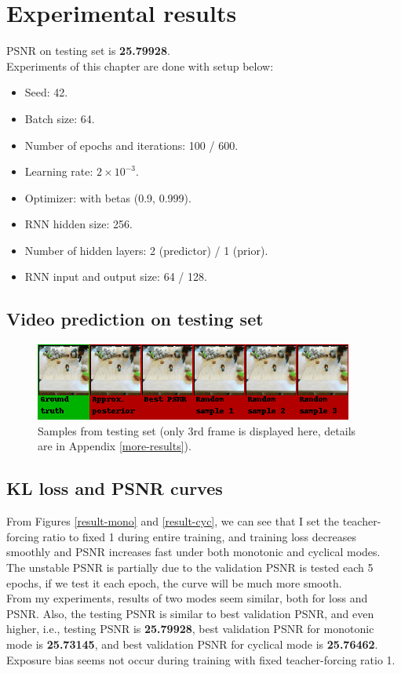 \chapter{Experimental results}
\indent
	PSNR on testing set is \textbf{25.79928}. \\
	Experiments of this chapter are done with setup below: 
	\begin{itemize}
		\item Seed: 42.
		\item Batch size: 64.
		\item Number of epochs and iterations: 100 / 600.
		\item Learning rate: $2 \times 10^{-3}$.
		\item Optimizer:  with betas (0.9, 0.999).
		\item RNN hidden size: 256.
		\item Number of hidden layers: 2 (predictor) / 1 (prior).
		\item RNN input and output size: 64 / 128.
	\end{itemize} 

\section{Video prediction on testing set}
	\begin{figure}[H]
		\centering
		\includegraphics[scale=0.9]{img/test_pred-2.png}
		\caption{Samples from testing set (only 3rd frame is displayed here, details are in Appendix \ref{more-results}).}
		\label{test-prediction}
	\end{figure}

\section{KL loss and PSNR curves}
	From Figures \ref{result-mono} and \ref{result-cyc}, 
	we can see that I set the teacher-forcing ratio to fixed 1 during entire training, 
	and training loss decreases smoothly and PSNR increases fast under both monotonic and cyclical modes. 
	The unstable PSNR is partially due to the validation PSNR is tested each 5 epochs, 
	if we test it each epoch, the curve will be much more smooth. \\
	From my experiments, results of two modes seem similar, both for loss and PSNR.
	Also, the testing PSNR is similar to best validation PSNR, and even higher, i.e., 
	testing PSNR is \textbf{25.79928}, best validation PSNR for monotonic mode is \textbf{25.73145}, 
	and best validation PSNR for cyclical mode is \textbf{25.76462}.
	Exposure bias seems not occur during training with fixed teacher-forcing ratio 1.
	

